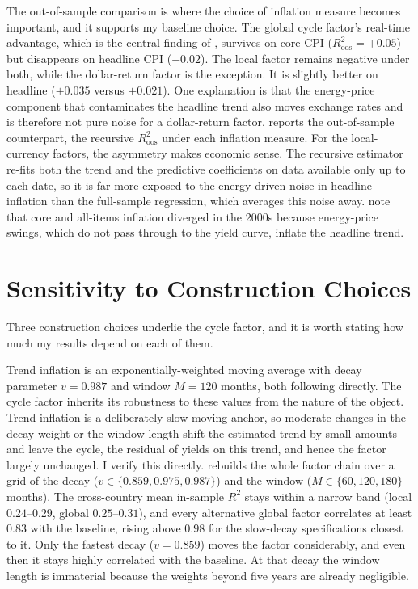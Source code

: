 The out-of-sample comparison is where the choice of inflation measure becomes
important, and it supports my baseline choice. The
global cycle factor's real-time advantage, which is the central finding of
, survives on core CPI ($R^{2}_{\mathrm{oos}}=+0.05$) but
disappears on headline CPI ($-0.02$). The local factor remains negative under
both, while the dollar-return factor is the exception. It is slightly
better on headline ($+0.035$ versus $+0.021$). One explanation is
that the energy-price component that contaminates the headline trend also moves
exchange rates \citep{ferraro2015} and is therefore not pure noise for a
dollar-return factor.  reports the out-of-sample
counterpart, the recursive $R^{2}_{\mathrm{oos}}$ under each inflation measure.
For the local-currency factors, the
asymmetry makes economic sense.
The recursive estimator re-fits both the trend and the predictive coefficients on
data available only up to each date, so it is far more exposed to the
energy-driven noise in headline inflation than the full-sample regression, which
averages this noise away. \citet{cieslak2015} note that core and all-items
inflation diverged in the 2000s because energy-price swings, which do
not pass through to the yield curve, inflate the headline trend.

\section{Sensitivity to Construction Choices}
\label{sec:rob-sensitivity}

Three construction choices underlie the cycle factor, and it is worth stating how
much my results depend on each of them.

Trend inflation is an exponentially-weighted
moving average with decay parameter $v=0.987$ and
window $M=120$ months, both following \citet{cieslak2015} directly. The
cycle factor inherits its robustness to these values from the nature of the object.
Trend inflation is a deliberately slow-moving anchor, so moderate changes in the
decay weight or the window length shift the estimated trend by small amounts and
leave the cycle, the residual of yields on this trend, and hence the factor
largely unchanged. I verify this directly.  rebuilds the
whole factor chain over a grid of the decay ($v\in\{0.859,0.975,0.987\}$) and
the window ($M\in\{60,120,180\}$ months). The cross-country mean in-sample
$R^{2}$ stays within a narrow band (local $0.24$--$0.29$, global $0.25$--$0.31$),
and every alternative global factor correlates at least $0.83$ with the
baseline, rising above $0.98$ for the slow-decay specifications closest to it.
Only the fastest decay ($v=0.859$) moves the factor
considerably, and even then it stays highly correlated with the baseline. At that
decay the window length is immaterial because the weights beyond five years are
already negligible.

